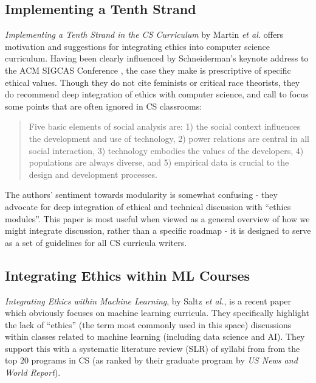 \documentclass{article}
\newcommand{\etal}{\textit{et al.}}
\begin{document}
    \subsection{Implementing a Tenth Strand}
        \textit{Implementing a Tenth Strand in the CS Curriculum} by Martin \etal \cite{martinImplementingTenthStrand1996} offers motivation and suggestions for integrating ethics into computer science curriculum.
        Having been clearly influenced by Schneiderman's keynote address to the ACM SIGCAS Conference \cite{shneidermanHumanValuesFuture1990},
        the case they make is prescriptive of specific ethical values. Though they do not cite feminists or critical race theorists, they do recommend deep integration of ethics with computer science, and call to focus some points that are often ignored in CS classrooms:
        \begin{quote}
        Five basic elements of social analysis are: 1) the social context influences the development and use of technology, 2) power relations are central in all social interaction, 3) technology embodies the values of the developers, 4) populations are always diverse, and 5) empirical data is crucial to the design and development processes.
        \end{quote}
        The authors' sentiment towards modularity is somewhat confusing - they advocate for deep integration of ethical and technical discussion with ``ethics modules''.
        This paper is most useful when viewed as a general overview of how we might integrate discussion, rather than a specific roadmap - it is designed to serve as a set of guidelines for all CS curricula writers.
        
    \subsection{Integrating Ethics within ML Courses}
        \textit{Integrating Ethics within Machine Learning}, by Saltz \etal \cite{saltzIntegratingEthicsMachine2019}, is a recent paper which obviously focuses on machine learning curricula. They specifically highlight the lack of ``ethics'' (the term most commonly used in this space) discussions within classes related to machine learning (including data science and AI). They support this with a systematic literature review (SLR) \cite{kitchenhamGuidelinesPerformingSystematic2007} of syllabi from from the top 20 programs in CS (as ranked by their graduate program by \textit{US News and World Report}).
        
    
%
%


\end{document}
